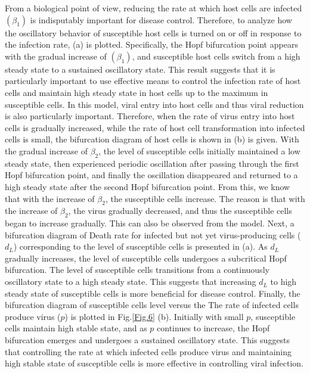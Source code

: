 \documentclass{CMHPhD-SIVD}
\begin{document}
From a biological point of view, reducing the rate at which host cells are infected $(\beta_1)$ is indisputably important for disease control. Therefore, to analyze how the oscillatory behavior of susceptible host cells is turned on or off in response to the infection rate, (a) is plotted. Specifically, the Hopf bifurcation point appears with the gradual increase of $(\beta_1)$, and susceptible host cells switch from a high steady state to a sustained oscillatory state. This result suggests that it is particularly important to use effective means to control the infection rate of host cells and maintain high steady state in host cells up to the maximum in susceptible cells. In this model, viral entry into host cells and thus viral reduction is also particularly important. Therefore, when the rate of virus entry into host cells is gradually increased, while the rate of host cell transformation into infected cells is small, the bifurcation diagram of host cells is shown in (b) is given. With the gradual increase of $\beta_2$, the level of susceptible cells initially maintained a low steady state, then experienced periodic oscillation after passing through the first Hopf bifurcation point, and finally the oscillation disappeared and returned to a high steady state after the second Hopf bifurcation point. From this, we know that with the increase of $\beta_2$, the susceptible cells increase. The reason is that with the increase of $\beta_2$, the virus gradually decreased, and thus the susceptible cells began to increase gradually. This can also be observed from the model. Next, a bifurcation diagram of Death rate for infected but not yet virus-producing cells ($d_L$) corresponding to the level of susceptible cells is presented in  (a). As $d_L$ gradually increases, the level of susceptible cells undergoes a subcritical Hopf bifurcation. The level of susceptible cells transitions from a continuously oscillatory state to a high steady state. This suggests that increasing $d_L$ to high steady state of susceptible cells is more beneficial for disease control. Finally, the bifurcation diagram of susceptible cells level versus the The rate of infected cells produce virus ($p$) is plotted in Fig.\ref{Fig.6} (b). Initially with small $p$, susceptible cells maintain high stable state, and as $p$ continues to increase, the Hopf bifurcation emerges and undergoes a sustained oscillatory state. This suggests that controlling the rate at which infected cells produce virus and maintaining high stable state of susceptible cells is more effective in controlling viral infection.
\end{document}

